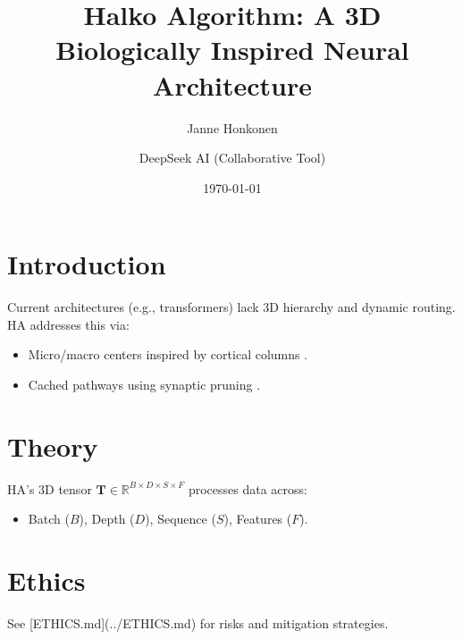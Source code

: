\documentclass{article}
\title{Halko Algorithm: A 3D Biologically Inspired Neural Architecture}
\author{Janne Honkonen \and DeepSeek AI (Collaborative Tool)}
\date{\today}
\begin{document}
\maketitle

\section{Introduction}
\label{sec:introduction}
Current architectures (e.g., transformers) lack 3D hierarchy and dynamic routing. HA addresses this via:

\begin{itemize}
    \item Micro/macro centers inspired by cortical columns \cite{hawkins2021thousand}.
    \item Cached pathways using synaptic pruning \cite{stoianov2022cortical}.
\end{itemize}

\section{Theory}
\label{sec:theory}
HA’s 3D tensor $\mathbf{T} \in \mathbb{R}^{B \times D \times S \times F}$ processes data across:
\begin{itemize}
    \item Batch ($B$), Depth ($D$), Sequence ($S$), Features ($F$).
\end{itemize}

\section{Ethics}
\label{sec:ethics}
See [ETHICS.md](../ETHICS.md) for risks and mitigation strategies.



\end{document}
